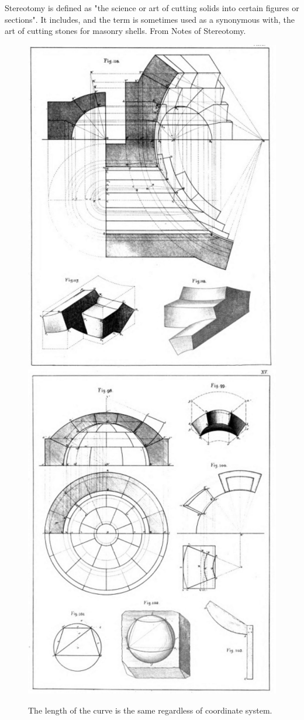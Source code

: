 Stereotomy is defined as "the science or art of cutting solids into certain figures or sections". It includes, and the term is sometimes used as a synonymous with, the art of cutting stones for masonry shells. From Notes of Stereotomy.

\begin{figure}[H]
\centering
\includegraphics[width=0.45\linewidth ]{figure/Introduction/NotesonStereotomy.JPG}
\includegraphics[width=0.45\linewidth ]{figure/Introduction/NotesonStereotomy2.JPG}
\caption{The length of the curve is the same regardless of coordinate system.}
\end{figure}




